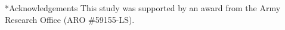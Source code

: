 \documentclass[12pt]{article}
\makeatletter
\renewcommand\section{\@startsection
	{subsection}{2}{0mm}
	{-0.2in}
	{0.05\baselineskip}
	{\normalfont\large\bfseries}}
\makeatother
\begin{document}

\newpage
%

\clearpage


\section*{Acknowledgements}
This study was supported by an award from the Army Research Office (ARO \#59155-LS).
\clearpage




\clearpage
\end{document}
